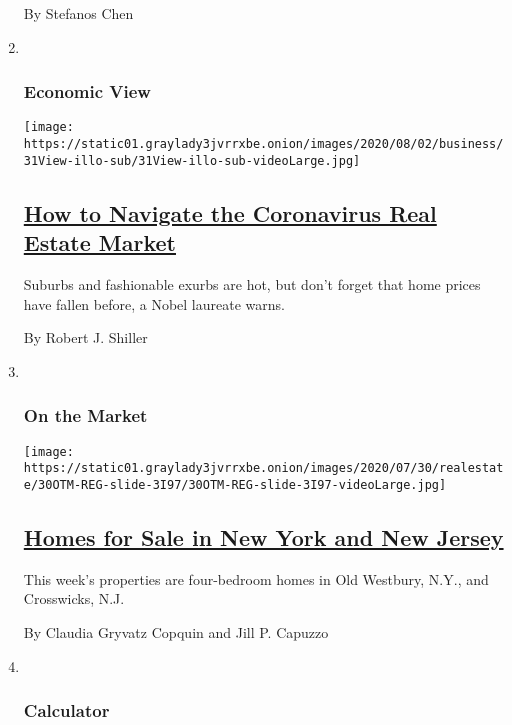 \begin{enumerate}
  By Stefanos Chen
\item ~
  \hypertarget{economic-view}{%
  \subsubsection{Economic View}\label{economic-view}}

  \texttt{[image: https://static01.graylady3jvrrxbe.onion/images/2020/08/02/business/31View-illo-sub/31View-illo-sub-videoLarge.jpg]}

  \hypertarget{how-to-navigate-the-coronavirus-real-estate-market}{%
  \subsection{\texorpdfstring{\href{/2020/07/31/business/housing-market-prices-risk.html}{How
  to Navigate the Coronavirus Real Estate
  Market}}{How to Navigate the Coronavirus Real Estate Market}}\label{how-to-navigate-the-coronavirus-real-estate-market}}

  Suburbs and fashionable exurbs are hot, but don't forget that home
  prices have fallen before, a Nobel laureate warns.

  By Robert J. Shiller
\item ~
  \hypertarget{on-the-market-1}{%
  \subsubsection{On the Market}\label{on-the-market-1}}

  \texttt{[image: https://static01.graylady3jvrrxbe.onion/images/2020/07/30/realestate/30OTM-REG-slide-3I97/30OTM-REG-slide-3I97-videoLarge.jpg]}

  \hypertarget{homes-for-sale-in-new-york-and-new-jersey}{%
  \subsection{\texorpdfstring{\href{/2020/07/30/realestate/homes-for-sale-in-new-york-and-new-jersey.html}{Homes
  for Sale in New York and New
  Jersey}}{Homes for Sale in New York and New Jersey}}\label{homes-for-sale-in-new-york-and-new-jersey}}

  This week's properties are four-bedroom homes in Old Westbury, N.Y.,
  and Crosswicks, N.J.

  By Claudia Gryvatz Copquin and Jill P. Capuzzo
\item ~
  \hypertarget{calculator}{%
  \subsubsection{Calculator}\label{calculator}}


\end{enumerate}
